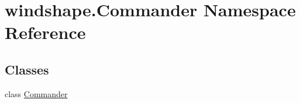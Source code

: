 \hypertarget{namespacewindshape_1_1_commander}{}\section{windshape.\+Commander Namespace Reference}
\label{namespacewindshape_1_1_commander}
\subsection*{Classes}
\begin{DoxyCompactItemize}
\item 
class \mbox{\hyperlink{classwindshape_1_1_commander_1_1_commander}{Commander}}
\end{DoxyCompactItemize}
